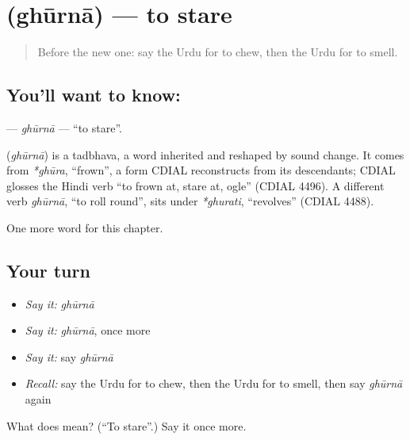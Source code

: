 \section[\texorpdfstring{\ur{گھورنا} (ghūrnā)}{گھورنا (ghūrnā)}]{ (ghūrnā) — to stare}

\label{lesson:UR-C239-ghurna}



\begin{quote}
Before the new one: say the Urdu for to chew, then the Urdu for to smell.
\end{quote}

\subsection*{You'll want to know: }
\textbf{} — \emph{ghūrnā} — \textquotedblleft{}to stare\textquotedblright{}.

\begin{cousinweb}
\textbf{} (\emph{ghūrnā}) is a tadbhava, a word inherited and reshaped by sound change. It comes from \emph{*ghūra}, \textquotedblleft{}frown\textquotedblright{}, a form CDIAL reconstructs from its descendants; CDIAL glosses the Hindi verb \textquotedblleft{}to frown at, stare at, ogle\textquotedblright{} (CDIAL 4496). A different verb \emph{ghūrnā}, \textquotedblleft{}to roll round\textquotedblright{}, sits under \emph{*ghurati}, \textquotedblleft{}revolves\textquotedblright{} (CDIAL 4488).
\end{cousinweb}

\begin{grammarlens}[title={What you've built}]
One more word for this chapter.
\end{grammarlens}

\subsection*{Your turn}
\begin{itemize}
\raggedright
  \item \emph{Say it:} \emph{ghūrnā}
  \item \emph{Say it:} \emph{ghūrnā}, once more
  \item \emph{Say it:} say \emph{ghūrnā}
  \item \emph{Recall:} say the Urdu for to chew, then the Urdu for to smell, then say \emph{ghūrnā} again
\end{itemize}

\begin{tcolorbox}[breakable,colback=teal!4,colframe=teal!35!black,title={Before you move on}]
What does  mean? (\textquotedblleft{}To stare\textquotedblright{}.) Say it once more.
\end{tcolorbox}
